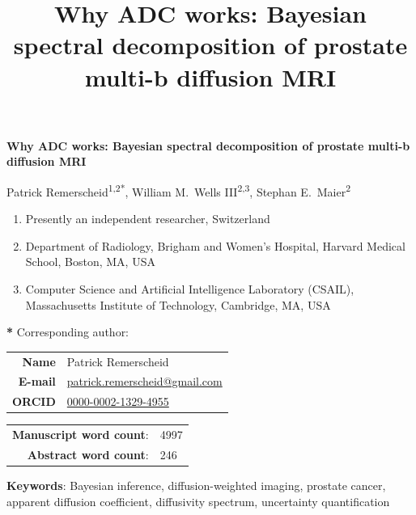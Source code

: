 \documentclass[11pt]{article}
\title{Why ADC works: Bayesian spectral decomposition of prostate multi-b diffusion MRI}
\newcommand{\email}[1]{\href{mailto:{#1}}{{#1}}}
\newcommand{\keywords}[1]{\textbf{Keywords}: {#1}}
\newcommand{\wordcount}[2]{\begin{tabular}{rl}%
\textbf{Manuscript word count}: & {#1}\\
\textbf{Abstract word count}: & {#2}\\
\end{tabular}}
\begin{document}
\begin{titlepage}
{\noindent\LARGE\bf Why ADC works: Bayesian spectral decomposition of prostate multi-b diffusion MRI}
\bigskip

\begin{flushleft}\large
    Patrick Remerscheid\textsuperscript{1,2{*}},
    William M.\ Wells III\textsuperscript{2,3},
    Stephan E.\ Maier\textsuperscript{2}
\end{flushleft}

\bigskip

\noindent
\begin{enumerate}[label=\textbf{\arabic*}]
\item Presently an independent researcher, Switzerland
\item Department of Radiology, Brigham and Women's Hospital, Harvard Medical School, Boston, MA, USA
\item Computer Science and Artificial Intelligence Laboratory (CSAIL), Massachusetts Institute of Technology, Cambridge, MA, USA
\end{enumerate}

\bigskip

\textbf{*} Corresponding author:

\indent\indent
\begin{tabular}{>{\bfseries}rl}
Name        & Patrick Remerscheid \\
E-mail      & \email{patrick.remerscheid@gmail.com} \\
ORCID       & \href{https://orcid.org/0000-0002-1329-4955}{0000-0002-1329-4955} \\
\end{tabular}

\vfill

\wordcount{4997}{246}

\end{titlepage}

\pagebreak



\bigskip
\keywords{Bayesian inference, diffusion-weighted imaging, prostate cancer, apparent diffusion coefficient, diffusivity spectrum, uncertainty quantification}
\pagebreak
\end{document}

